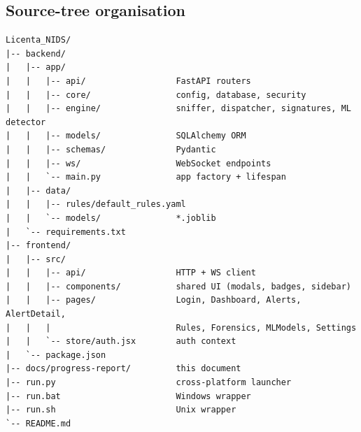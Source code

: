 \subsection{Source-tree organisation}

\begin{lstlisting}[basicstyle=\ttfamily\scriptsize,caption={Repository layout (abridged)}]
Licenta_NIDS/
|-- backend/
|   |-- app/
|   |   |-- api/                  FastAPI routers
|   |   |-- core/                 config, database, security
|   |   |-- engine/               sniffer, dispatcher, signatures, ML detector
|   |   |-- models/               SQLAlchemy ORM
|   |   |-- schemas/              Pydantic
|   |   |-- ws/                   WebSocket endpoints
|   |   `-- main.py               app factory + lifespan
|   |-- data/
|   |   |-- rules/default_rules.yaml
|   |   `-- models/               *.joblib
|   `-- requirements.txt
|-- frontend/
|   |-- src/
|   |   |-- api/                  HTTP + WS client
|   |   |-- components/           shared UI (modals, badges, sidebar)
|   |   |-- pages/                Login, Dashboard, Alerts, AlertDetail,
|   |   |                         Rules, Forensics, MLModels, Settings
|   |   `-- store/auth.jsx        auth context
|   `-- package.json
|-- docs/progress-report/         this document
|-- run.py                        cross-platform launcher
|-- run.bat                       Windows wrapper
|-- run.sh                        Unix wrapper
`-- README.md
\end{lstlisting}
